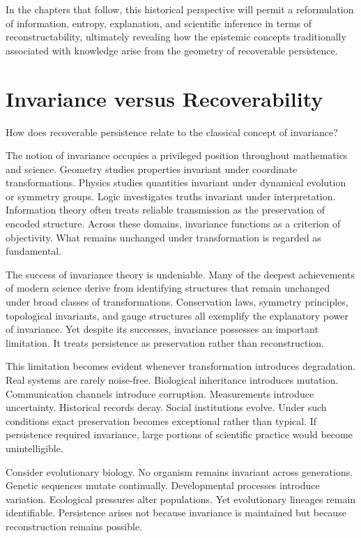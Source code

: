 \documentclass[12pt,oneside]{article}
\theoremstyle{definition}
\begin{document}
In the chapters that follow, this historical perspective will permit a reformulation of information, entropy, explanation, and scientific inference in terms of reconstructability, ultimately revealing how the epistemic concepts traditionally associated with knowledge arise from the geometry of recoverable persistence.

\section{Invariance versus Recoverability}

How does recoverable persistence relate to the classical concept of invariance?

The notion of invariance occupies a privileged position throughout mathematics and science. Geometry studies properties invariant under coordinate transformations. Physics studies quantities invariant under dynamical evolution or symmetry groups. Logic investigates truths invariant under interpretation. Information theory often treats reliable transmission as the preservation of encoded structure. Across these domains, invariance functions as a criterion of objectivity. What remains unchanged under transformation is regarded as fundamental.

The success of invariance theory is undeniable. Many of the deepest achievements of modern science derive from identifying structures that remain unchanged under broad classes of transformations. Conservation laws, symmetry principles, topological invariants, and gauge structures all exemplify the explanatory power of invariance. Yet despite its successes, invariance possesses an important limitation. It treats persistence as preservation rather than reconstruction.

This limitation becomes evident whenever transformation introduces degradation. Real systems are rarely noise-free. Biological inheritance introduces mutation. Communication channels introduce corruption. Measurements introduce uncertainty. Historical records decay. Social institutions evolve. Under such conditions exact preservation becomes exceptional rather than typical. If persistence required invariance, large portions of scientific practice would become unintelligible.

Consider evolutionary biology. No organism remains invariant across generations. Genetic sequences mutate continually. Developmental processes introduce variation. Ecological pressures alter populations. Yet evolutionary lineages remain identifiable. Persistence arises not because invariance is maintained but because reconstruction remains possible.
\end{document}
